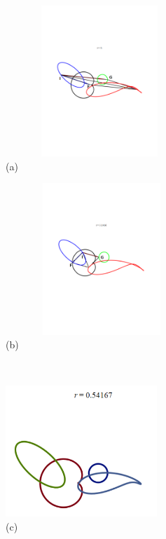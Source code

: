 \documentclass[12pt,a4paper]{article}%
\begin{document}
\begin{figure}
\begin{center}
\parbox[b]{2.8in}{\begin{center}
\includegraphics[natheight=2.503100in,natwidth=3.131000in,height=2.2387in,width=2.7966in]{IF+IG.pdf}
\\
(a)
\end{center}}
\qquad
\parbox[b]{2.8in}{\begin{center}
\includegraphics[natheight=2.503100in,natwidth=3.172700in,height=2.2565in,width=2.8525in]{IF+IG_Pi.pdf}
\\
(b)
\end{center}}
\\
\parbox[b]{2.8in}{\begin{center}
\includegraphics[natheight=2.286600in,natwidth=2.635200in,height=1.9585in,width=2.2538in]{PJH75H1C.pdf}
\\
(c)
\end{center}}

\end{center}
\end{figure}
\end{document}
